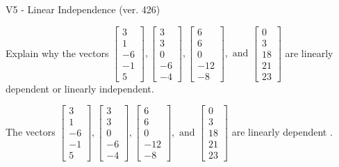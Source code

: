 \begin{exercise}
  \begin{exerciseTitle}V5 - Linear Independence (ver. 426)\end{exerciseTitle}
  \begin{exerciseStatement}
    Explain why the vectors \(\left[\begin{array}{r}
3 \\
1 \\
-6 \\
-1 \\
5
\end{array}\right] , \left[\begin{array}{r}
3 \\
3 \\
0 \\
-6 \\
-4
\end{array}\right] , \left[\begin{array}{r}
6 \\
6 \\
0 \\
-12 \\
-8
\end{array}\right] , \text{ and } \left[\begin{array}{r}
0 \\
3 \\
18 \\
21 \\
23
\end{array}\right]\) are linearly dependent or linearly independent.	


  \end{exerciseStatement}
  \begin{exerciseAnswer}
   The vectors \(\left[\begin{array}{r}
3 \\
1 \\
-6 \\
-1 \\
5
\end{array}\right] , \left[\begin{array}{r}
3 \\
3 \\
0 \\
-6 \\
-4
\end{array}\right] , \left[\begin{array}{r}
6 \\
6 \\
0 \\
-12 \\
-8
\end{array}\right] , \text{ and } \left[\begin{array}{r}
0 \\
3 \\
18 \\
21 \\
23
\end{array}\right]\) are 
  	 linearly dependent  .
  


  \end{exerciseAnswer}
\end{exercise}